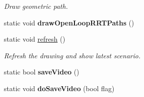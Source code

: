 \begin{DoxyCompactItemize}
\begin{DoxyCompactList}\small\item\em Draw geometric path. \end{DoxyCompactList}\item 
\hypertarget{class_visualizer_a7e56ae25a51fe94ac158f33a0b29fba8}{static void {\bfseries draw\-Open\-Loop\-R\-R\-T\-Paths} ()}\label{class_visualizer_a7e56ae25a51fe94ac158f33a0b29fba8}

\item 
\hypertarget{class_visualizer_a5dc2040eeebd6568034c3230cccd8530}{static void \hyperlink{class_visualizer_a5dc2040eeebd6568034c3230cccd8530}{refresh} ()}\label{class_visualizer_a5dc2040eeebd6568034c3230cccd8530}

\begin{DoxyCompactList}\small\item\em Refresh the drawing and show latest scenario. \end{DoxyCompactList}\item 
\hypertarget{class_visualizer_a8a7b15c56dc6823af1cdbafdb238ba1a}{static bool {\bfseries save\-Video} ()}\label{class_visualizer_a8a7b15c56dc6823af1cdbafdb238ba1a}

\item 
\hypertarget{class_visualizer_a22e7426a0b03231d20a2e7ce37d728e7}{static void {\bfseries do\-Save\-Video} (bool flag)}\label{class_visualizer_a22e7426a0b03231d20a2e7ce37d728e7}

\end{DoxyCompactItemize}
